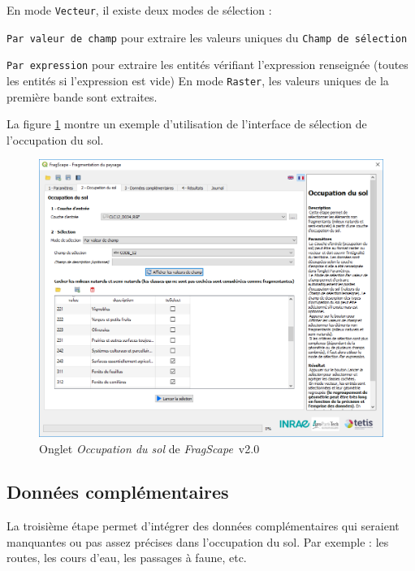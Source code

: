 \documentclass[11pt]{article}
\newcommand{\source}[1]{\vspace*{-0.4cm}\caption*{\textit{Source: {#1}}}}
\newcommand{\tool}{\emph{FragScape}}
\let\tempone\itemize
\let\temptwo\enditemize
\renewenvironment{itemize}{\tempone\addtolength{\itemsep}{-0.5\baselineskip}}{\temptwo}
\begin{document}
\vspace*{-0.5cm}
En mode \texttt{Vecteur}, il existe deux modes de sélection :
\vspace*{-0.2cm}
\begin{itemize}
\item \texttt{Par valeur de champ} pour extraire les valeurs uniques du \texttt{Champ de sélection}
\item \texttt{Par expression} pour extraire les entités vérifiant l'expression renseignée (toutes les entités si l'expression est vide)
\end{itemize}
\vspace*{-0.2cm}
En mode \texttt{Raster}, les valeurs uniques de la première bande sont extraites.
\frameboxend

La figure \ref{fig:landuseTab} montre un exemple d'utilisation de l'interface de sélection de l'occupation du sol.

\begin{figure}[h!]
    \centering
    \includegraphics[scale=0.6]{pictures/landuseTabFr_v2.png}
    \caption{Onglet \textit{Occupation du sol} de \tool\ v2.0}
    \label{fig:landuseTab}
\end{figure}

\subsection{Données complémentaires}

La troisième étape permet d'intégrer des données complémentaires qui seraient manquantes ou pas assez précises dans l'occupation du sol. Par exemple : les routes, les cours d'eau, les passages à faune, etc.
\end{document}
